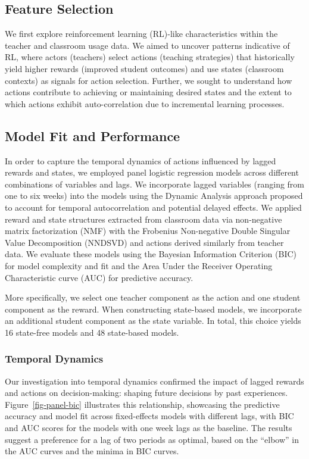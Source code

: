 \documentclass[
  number,
  preprint,
  3p,
  onecolumn]{elsarticle}
\begin{document}
\subsection{Feature Selection}\label{feature-selection-1}

We first explore reinforcement learning (RL)-like characteristics within
the teacher and classroom usage data. We aimed to uncover patterns
indicative of RL, where actors (teachers) select actions (teaching
strategies) that historically yield higher rewards (improved student
outcomes) and use states (classroom contexts) as signals for action
selection. Further, we sought to understand how actions contribute to
achieving or maintaining desired states and the extent to which actions
exhibit auto-correlation due to incremental learning processes.

\subsection{Model Fit and Performance}\label{model-fit-and-performance}

In order to capture the temporal dynamics of actions influenced by
lagged rewards and states, we employed panel logistic regression models
across different combinations of variables and lags. We incorporate
lagged variables (ranging from one to six weeks) into the models using
the Dynamic Analysis approach proposed to account for temporal
autocorrelation and potential delayed effects. We applied reward and
state structures extracted from classroom data via non-negative matrix
factorization (NMF) with the Frobenius Non-negative Double Singular
Value Decomposition (NNDSVD) and actions derived similarly from teacher
data. We evaluate these models using the Bayesian Information Criterion
(BIC) for model complexity and fit and the Area Under the Receiver
Operating Characteristic curve (AUC) for predictive accuracy.

More specifically, we select one teacher component as the action and one
student component as the reward. When constructing state-based models,
we incorporate an additional student component as the state variable. In
total, this choice yields 16 state-free models and 48 state-based
models.

\subsubsection{Temporal Dynamics}\label{temporal-dynamics}

Our investigation into temporal dynamics confirmed the impact of lagged
rewards and actions on decision-making: shaping future decisions by past
experiences. Figure~\ref{fig-panel-bic} illustrates this relationship,
showcasing the predictive accuracy and model fit across fixed-effects
models with different lags, with BIC and AUC scores for the models with
one week lags as the baseline. The results suggest a preference for a
lag of two periods as optimal, based on the ``elbow'' in the AUC curves
and the minima in BIC curves.
\end{document}
